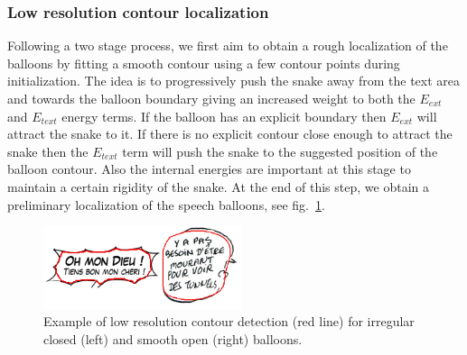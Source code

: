 \subsubsection{Low resolution contour localization}
Following a two stage process, we first aim to obtain a rough localization of the balloons by fitting a smooth contour using a few contour points during initialization.
The idea is to progressively push the snake away from the text area and towards the balloon boundary giving an increased weight to both the $E_{ext}$ and $E_{text}$ energy terms.
If the balloon has an explicit boundary then $E_{ext}$ will attract the snake to it.
If there is no explicit contour close enough to attract the snake then the $E_{text}$ term will push the snake to the suggested position of the balloon contour.
Also the internal energies are important at this stage to maintain a certain rigidity of the snake.
At the end of this step, we obtain a preliminary localization of the speech balloons, see fig.~\ref{fig:se:se:mono_res_det}. 

	\begin{figure}[!ht]	%
	  \centering
		\includegraphics[trim = 0mm 3mm 0mm 1mm, clip, width=220px]{mono_res_det.png}
		\caption{Example of low resolution contour detection (red line) for irregular closed (left) and smooth open (right) balloons.}
		\label{fig:se:se:mono_res_det}
	\end{figure}


